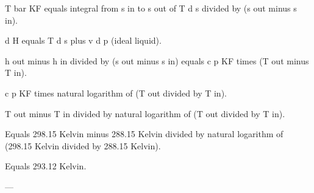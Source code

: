 T bar KF equals integral from s in to s out of T d s divided by (s out minus s in).  

d H equals T d s plus v d p (ideal liquid).  

h out minus h in divided by (s out minus s in) equals c p KF times (T out minus T in).  

c p KF times natural logarithm of (T out divided by T in).  

T out minus T in divided by natural logarithm of (T out divided by T in).  

Equals 298.15 Kelvin minus 288.15 Kelvin divided by natural logarithm of (298.15 Kelvin divided by 288.15 Kelvin).  

Equals 293.12 Kelvin.  

---